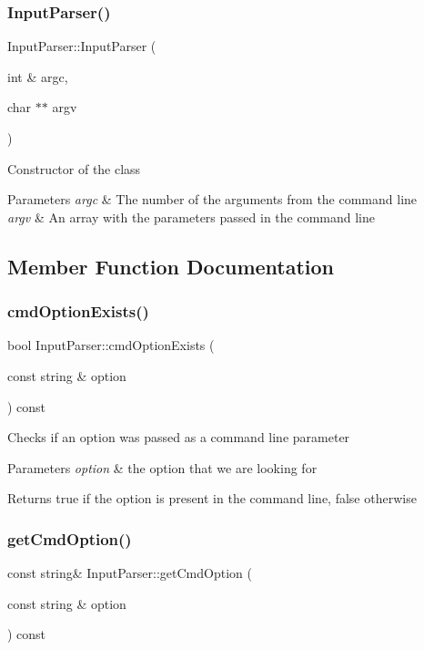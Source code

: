 \subsubsection{InputParser()}
{\footnotesize\ttfamily Input\+Parser\+::\+Input\+Parser (\begin{DoxyParamCaption}\item[{int \&}]{argc,  }\item[{char $\ast$$\ast$}]{argv }\end{DoxyParamCaption})}

Constructor of the class 
\begin{DoxyParams}{Parameters}
{\em argc} & The number of the arguments from the command line \\
\hline
{\em argv} & An array with the parameters passed in the command line \\
\hline
\end{DoxyParams}


\subsection{Member Function Documentation}
\mbox{\label{class_input_parser_ad3d06a9c59e91f425295bdc8408e0544}} 
\subsubsection{cmdOptionExists()}
{\footnotesize\ttfamily bool Input\+Parser\+::cmd\+Option\+Exists (\begin{DoxyParamCaption}\item[{const string \&}]{option }\end{DoxyParamCaption}) const}

Checks if an option was passed as a command line parameter 
\begin{DoxyParams}{Parameters}
{\em option} & the option that we are looking for \\
\hline
\end{DoxyParams}
\begin{DoxyReturn}{Returns}
true if the option is present in the command line, false otherwise 
\end{DoxyReturn}
\mbox{\label{class_input_parser_aac05d7ad7794084907a0b57ab3e7d607}} 
\subsubsection{getCmdOption()}
{\footnotesize\ttfamily const string\& Input\+Parser\+::get\+Cmd\+Option (\begin{DoxyParamCaption}\item[{const string \&}]{option }\end{DoxyParamCaption}) const}

